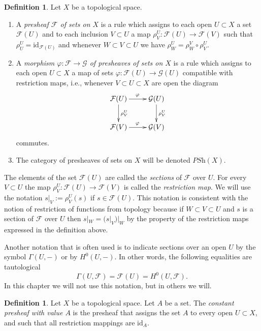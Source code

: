 \documentclass{stacks-project}
\theoremstyle{plain}
\theoremstyle{definition}
\newtheorem{definition}[subsection]{Definition}
\theoremstyle{remark}
\numberwithin{equation}{subsection}
\begin{document}
\begin{definition}
\label{definition-presheaf}
Let $X$ be a topological space.
\begin{enumerate}
\item A {\it presheaf $\mathcal{F}$ of sets on $X$} is a rule which
assigns to each open $U \subset X$ a set $\mathcal{F}(U)$ and
to each inclusion $V \subset U$ a map
$\rho^U_V : \mathcal{F}(U) \to \mathcal{F}(V)$ such that
$\rho^U_U = \text{id}_{\mathcal{F}(U)}$ and
whenever $W \subset V \subset U$ we have
$\rho^U_W = \rho^V_W \circ \rho ^U_V$.
\item A {\it morphism $\varphi : \mathcal{F} \to \mathcal{G}$
of presheaves of sets on $X$} is a rule which assigns to each
open $U \subset X$ a map of sets $\varphi : \mathcal{F}(U)
\to \mathcal{G}(U)$ compatible with restriction maps,
i.e., whenever $V \subset U \subset X$ are open the
diagram
$$
\xymatrix{
\mathcal{F}(U) \ar[r]^\varphi \ar[d]^{\rho^U_V} &
\mathcal{G}(U) \ar[d]^{\rho^U_V} \\
\mathcal{F}(V) \ar[r]^\varphi & \mathcal{G}(V)
}
$$
commutes.
\item The category of presheaves of sets on $X$ will be denoted
$\textit{PSh}(X)$.
\end{enumerate}
\end{definition}

\noindent
The elements of the set $\mathcal{F}(U)$ are called
the {\it sections} of $\mathcal{F}$ over $U$.
For every $V \subset U$ the map
$\rho^U_V : \mathcal{F}(U) \to \mathcal{F}(V)$
is called the {\it restriction map}. We will use the
notation $s|_V := \rho^U_V(s)$ if $s\in \mathcal{F}(U)$.
This notation is consistent with the notion of restriction
of functions from topology because if $W \subset V \subset U$
and $s$ is a section of $\mathcal{F}$ over $U$ then
$s|_W = (s|_V)|_W$ by the property of the restriction maps
expressed in the definition above.

\medskip\noindent
Another notation that is often used is to indicate sections
over an open $U$ by the symbol $\Gamma(U, -)$ or by
$H^0(U, -)$. In other words, the following equalities
are tautological
$$
\Gamma(U, \mathcal{F}) = \mathcal{F}(U) = H^0(U, \mathcal{F}).
$$
In this chapter we will not use this notation, but in others
we will.

\begin{definition}
\label{definition-constant-presheaf}
Let $X$ be a topological space. Let $A$ be a set.
The {\it constant presheaf with value $A$} is the
presheaf that assigns the set $A$ to every open
$U \subset X$, and such that all restriction mappings
are $\text{id}_A$.
\end{definition}
\end{document}
